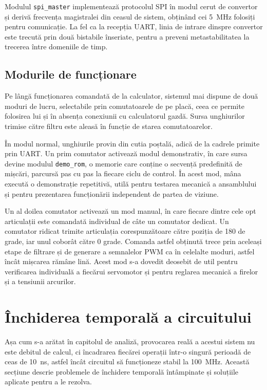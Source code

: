 Modulul \texttt{spi\_master} implementează protocolul SPI în modul cerut de convertor
și derivă frecvența magistralei din ceasul de sistem, obținând cei 5~MHz folosiți
pentru comunicație. La fel ca la recepția UART, linia de intrare dinspre convertor
este trecută prin două bistabile înseriate, pentru a preveni metastabilitatea la
trecerea între domeniile de timp.

\subsection{Modurile de funcționare}

Pe lângă funcționarea comandată de la calculator, sistemul mai dispune de două moduri
de lucru, selectabile prin comutatoarele de pe placă, ceea ce permite folosirea lui și
în absența conexiunii cu calculatorul gazdă. Sursa unghiurilor trimise către filtru
este aleasă în funcție de starea comutatoarelor.

În modul normal, unghiurile provin din cutia poștală, adică de la cadrele primite prin
UART. Un prim comutator activează modul demonstrativ, în care sursa devine modulul
\texttt{demo\_rom}, o memorie care conține o secvență predefinită de mișcări, parcursă
pas cu pas la fiecare ciclu de control. În acest mod, mâna execută o demonstrație
repetitivă, utilă pentru testarea mecanică a ansamblului și pentru prezentarea
funcționării independent de partea de viziune.

Un al doilea comutator activează un mod manual, în care fiecare dintre cele opt
articulații este comandată individual de câte un comutator dedicat. Un comutator ridicat
trimite articulația corespunzătoare către poziția de 180 de grade, iar unul coborât către
0 grade. Comanda astfel obținută trece prin aceleași etape de filtrare și de generare a
semnalelor PWM ca în celelalte moduri, astfel încât mișcarea rămâne lină. Acest mod
s-a dovedit deosebit de util pentru verificarea individuală a fiecărui servomotor și
pentru reglarea mecanică a firelor și a tensiunii arcurilor.

\section{Închiderea temporală a circuitului}
\label{sec:proiectare-timing}

Așa cum s-a arătat în capitolul de analiză, provocarea reală a acestui sistem nu
este debitul de calcul, ci încadrarea fiecărei operații într-o singură perioadă de
ceas de 10~ns, astfel încât circuitul să funcționeze stabil la 100~MHz. Această
secțiune descrie problemele de închidere temporală întâmpinate și soluțiile aplicate
pentru a le rezolva.

